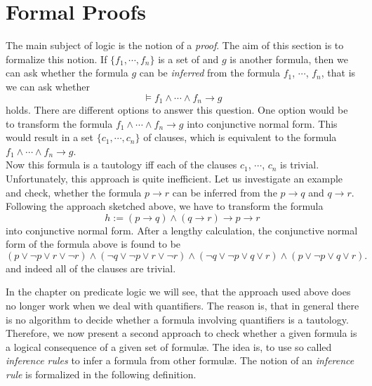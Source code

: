 
\section{Formal Proofs}
The main subject of logic is the notion of a \emph{proof}.  The aim of this section is to 
formalize this notion.
If $\{f_1,\cdots,f_n\}$ is a set of \formulae and $g$ is another formula,  then 
we can ask whether the formula $g$ can be \emph{inferred} from the formula $f_1$, $\cdots$,
$f_n$, that is we can ask whether 
\[ \models f_1 \wedge \cdots \wedge f_n \rightarrow g \]
holds.  There are different options to answer this question.
One option would be to transform the formula $f_1 \wedge \cdots \wedge f_n \rightarrow g$ into
conjunctive normal form.  This would result in a set 
$\{c_1,\cdots,c_n\}$ of clauses, which is equivalent to the formula
\\[0.2cm]
\hspace*{1.3cm} $f_1 \wedge \cdots \wedge f_n \rightarrow g$.
\\[0.2cm] 
Now this formula is a tautology iff each of the clauses  $c_1$, $\cdots$, $c_n$ is trivial.  
Unfortunately,  this approach is quite inefficient.  Let us investigate an example and
check, whether the formula  $p \rightarrow r$ can be inferred from the \formulae $p \rightarrow q$ and
$q \rightarrow r$.   Following the approach sketched above, we have to transform the formula
\[ h := (p \rightarrow q) \wedge (q \rightarrow r) \rightarrow p \rightarrow r
\]
into conjunctive normal form.  After a lengthy calculation, the conjunctive normal form of
the formula above is found to be
\[
   (p \vee \neg p \vee r \vee \neg r) \wedge (\neg q \vee \neg p \vee r \vee \neg r) \wedge
   (\neg q \vee \neg p \vee q \vee r) \wedge (p \vee \neg p \vee q \vee r). 
\]
and indeed all of the clauses are trivial.  

In the chapter on predicate logic we will see, that the approach used above does no longer
work when we deal with quantifiers.  The reason is, that in general there is no algorithm
to decide whether a formula involving quantifiers is a tautology.
  Therefore, we now present a second approach  to check whether a given formula is a logical consequence 
of a given set of formul\ae.  The idea is, to use so called
 \emph{inference rules} to infer a formula from other formul\ae.
The notion of an \emph{inference rule} is formalized in the following definition.
  
